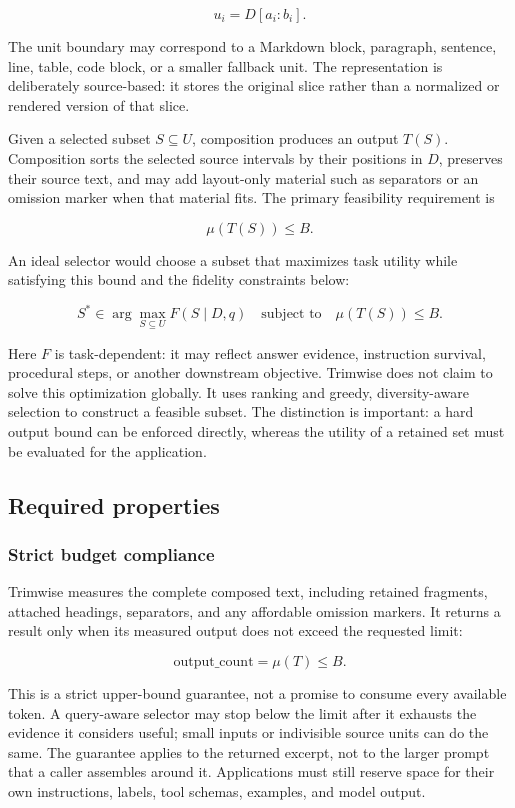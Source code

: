 \documentclass[
]{article}
\begin{document}
\[
u_i = D[a_i:b_i].
\]

The unit boundary may correspond to a Markdown block, paragraph,
sentence, line, table, code block, or a smaller fallback unit. The
representation is deliberately source-based: it stores the original
slice rather than a normalized or rendered version of that slice.

Given a selected subset \(S \subseteq U\), composition produces an
output \(T(S)\). Composition sorts the selected source intervals by
their positions in \(D\), preserves their source text, and may add
layout-only material such as separators or an omission marker when that
material fits. The primary feasibility requirement is

\[
\mu(T(S)) \leq B.
\]

An ideal selector would choose a subset that maximizes task utility
while satisfying this bound and the fidelity constraints below:

\[
S^* \in \arg\max_{S \subseteq U} F(S \mid D, q)
\quad \text{subject to} \quad \mu(T(S)) \leq B.
\]

Here \(F\) is task-dependent: it may reflect answer evidence,
instruction survival, procedural steps, or another downstream objective.
Trimwise does not claim to solve this optimization globally. It uses
ranking and greedy, diversity-aware selection to construct a feasible
subset. The distinction is important: a hard output bound can be
enforced directly, whereas the utility of a retained set must be
evaluated for the application.

\subsection{Required properties}\label{required-properties}

\subsubsection{Strict budget compliance}\label{strict-budget-compliance}

Trimwise measures the complete composed text, including retained
fragments, attached headings, separators, and any affordable omission
markers. It returns a result only when its measured output does not
exceed the requested limit:

\[
\text{output\_count} = \mu(T) \leq B.
\]

This is a strict upper-bound guarantee, not a promise to consume every
available token. A query-aware selector may stop below the limit after
it exhausts the evidence it considers useful; small inputs or
indivisible source units can do the same. The guarantee applies to the
returned excerpt, not to the larger prompt that a caller assembles
around it. Applications must still reserve space for their own
instructions, labels, tool schemas, examples, and model output.
\end{document}

